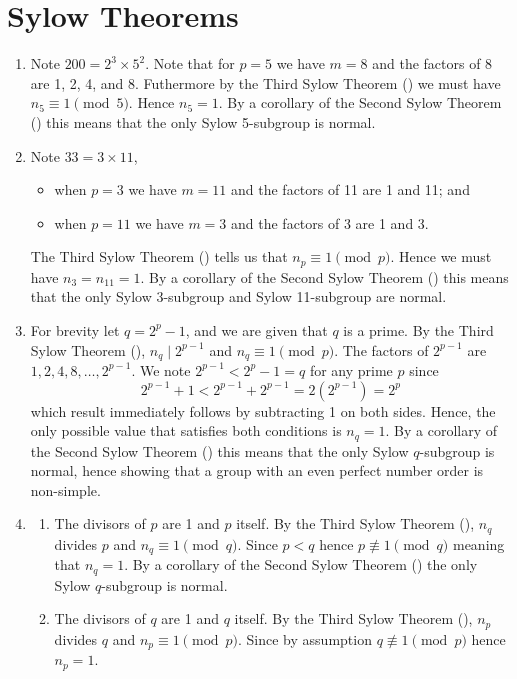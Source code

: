 \section{Sylow Theorems}
\begin{enumerate}
    \item Note $200 = 2^3 \times 5^2$. Note that for $p = 5$ we have $m = 8$ and the factors of 8 are 1, 2, 4, and 8. Futhermore by the Third Sylow Theorem () we must have $n_5 \equiv 1 \pmod 5$. Hence $n_5 = 1$. By a corollary of the Second Sylow Theorem () this means that the only Sylow 5-subgroup is normal.

    \item Note $33 = 3 \times 11$,
    \begin{itemize}
        \item when $p = 3$ we have $m = 11$ and the factors of 11 are 1 and 11; and
        \item when $p = 11$ we have $m = 3$ and the factors of 3 are 1 and 3.
    \end{itemize}
    The Third Sylow Theorem () tells us that $n_p \equiv 1 \pmod p$. Hence we must have $n_3 = n_{11} = 1$. By a corollary of the Second Sylow Theorem () this means that the only Sylow 3-subgroup and Sylow 11-subgroup are normal.

    \item For brevity let $q = 2^p - 1$, and we are given that $q$ is a prime. By the Third Sylow Theorem (), $n_q \mid 2^{p-1}$ and $n_q \equiv 1 \pmod p$. The factors of $2^{p-1}$ are $1, 2, 4, 8, \dots, 2^{p-1}$. We note $2^{p-1} < 2^p - 1 = q$ for any prime $p$ since
    \[
        2^{p-1} + 1 < 2^{p-1} + 2^{p-1} = 2(2^{p-1}) = 2^p    
    \]
    which result immediately follows by subtracting 1 on both sides. Hence, the only possible value that satisfies both conditions is $n_q = 1$. By a corollary of the Second Sylow Theorem () this means that the only Sylow $q$-subgroup is normal, hence showing that a group with an even perfect number order is non-simple.

    \item \begin{enumerate}[label=(\roman*)]
        \item The divisors of $p$ are 1 and $p$ itself. By the Third Sylow Theorem (), $n_q$ divides $p$ and $n_q \equiv 1 \pmod q$. Since $p < q$ hence $p \not\equiv 1 \pmod q$ meaning that $n_q = 1$. By a corollary of the Second Sylow Theorem () the only Sylow $q$-subgroup is normal.
        \item The divisors of $q$ are 1 and $q$ itself. By the Third Sylow Theorem (), $n_p$ divides $q$ and $n_p \equiv 1 \pmod p$. Since by assumption $q \not\equiv 1 \pmod p$ hence $n_p = 1$.
        

\end{enumerate}
\end{enumerate}
